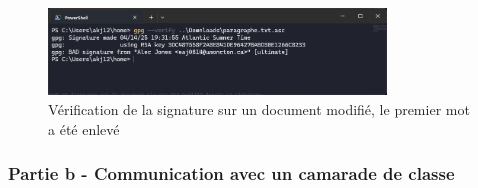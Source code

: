 \documentclass[12pt,a4paper]{article}
\begin{document}
\begin{figure}[ht]
    \centering
    \includegraphics[width=0.8\textwidth]{../img/verif_modif.png}
    \caption{Vérification de la signature sur un document modifié, le premier mot a été enlevé}
    \label{verif_modif}
\end{figure}

\subsubsection{Partie b - Communication avec un camarade de classe}
\end{document}
